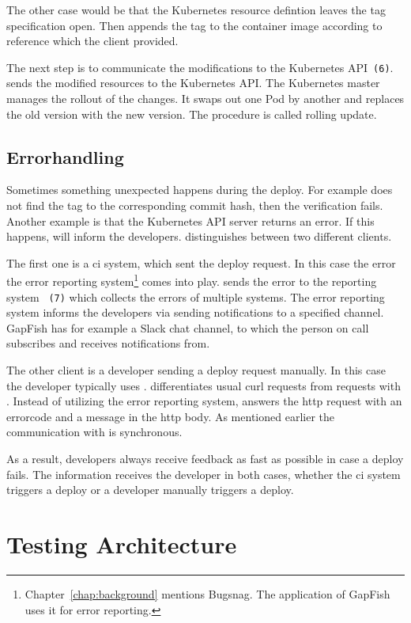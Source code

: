 The other case would be that the Kubernetes resource defintion leaves the tag
specification open. Then \deployer appends the tag to the container image according to
reference which the client provided.

The next step is to communicate the modifications to the Kubernetes
API~\texttt{(6)}. \deployer sends the modified resources to the Kubernetes API. The
Kubernetes master manages the rollout of the changes. It swaps out one Pod by another and
replaces the old version with the new version. The procedure is called rolling update.

\subsection{Errorhandling}

Sometimes something unexpected happens during the deploy. For example \deployer does not
find the tag to the corresponding commit hash, then the verification fails. Another
example is that the Kubernetes API server returns an error. If this happens, \deployer will
inform the developers. \deployer distinguishes between two different clients.

The first one is a \gls{ci} system, which sent the deploy request. In this case the error
the error reporting system\footnote{Chapter~\ref{chap:background} mentions Bugsnag. The
  application of GapFish uses it for error reporting.} comes into play. \deployer sends the
error to the reporting system ~\texttt{(7)} which collects the errors of multiple
systems. The error reporting system informs the developers via sending notifications to a
specified channel. GapFish has for example a Slack chat channel, to which the person on
call subscribes and receives notifications from.

The other client is a developer sending a deploy request manually. In this case the
developer typically uses \depctl. \deployer differentiates usual curl requests from
requests with \depctl. Instead of utilizing the error reporting system, \deployer answers
the http request with an errorcode and a message in the http body. As mentioned earlier
the communication with \deployer is synchronous.

As a result, developers always receive feedback as fast as possible in case a deploy
fails. The information receives the developer in both cases, whether the \gls{ci} system
triggers a deploy or a developer manually triggers a deploy.

\section{Testing Architecture}
\label{test_architecture}

